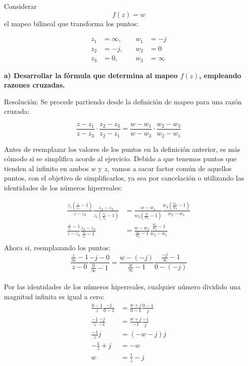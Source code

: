 \documentclass[12pt]{report}
\begin{document}
Considerar $$ f(z) = w $$ el mapeo bilineal que transforma los puntos:

\begin{align*}
    z_1 &= \infty, \quad & w_1 &= -j \\
    z_2 &= -j, \quad & w_2 &= 0 \\
    z_3 &= 0, \quad & w_3 &= \infty 
\end{align*}

\textbf{a) Desarrollar la fórmula que determina al mapeo \( f(z) \), empleando razones cruzadas.}

Resolución: Se procede partiendo desde la definición de mapeo para una razón cruzada:

$$ \frac{z - z_1}{z - z_3} \cdot \frac{z_2 - z_3}{z_2 - z_1} = \frac{w - w_1}{w - w_3} \cdot \frac{w_2 - w_3}{w_2 - w_1} $$

Antes de reemplazar los valores de los puntos en la definición anterior, es más cómodo si se simplifica acorde al ejercicio. Debido a que tenemos puntos que tienden al infinito en ambos \( w \) y \( z \), vamos a sacar factor común de aquellos puntos, con el objetivo de simplificarlos, ya sea por cancelación o utilizando las identidades de los números hiperreales:

\begin{align*}
    \frac{z_1 \left(\frac{z}{z_1}-1\right) }{z-z_3} \frac{z_2-z_3}{z_1 \left( \frac{z_3}{z_2} -1 \right) } &= \frac{w-w_1}{w_3 \left( \frac{w}{w_3} - 1 \right)} \frac{w_3 \left( \frac{w_1}{w_3} -1 \right) }{w_2-w_1}\\[10pt]
    \frac{\frac{z}{z_1} -1}{z-z_3} \frac{z_2-z_3}{\frac{z_3}{z_1}-1} &= \frac{w-w_1}{\frac{w}{w_3}-1} \frac{\frac{w_1}{w_3}-1}{w_2-w_1}\\
\end{align*}
Ahora si, reemplazando los puntos:\\

$$\frac{\frac{z}{\infty}-1}{z-0} \frac{-j-0}{\frac{0}{\infty}-1} = \frac{w-(-j)}{\frac{w}{\infty}-1} \frac{\frac{-j}{\infty}-1}{0-(-j)}$$\\

Por las identidades de los números hiperreales, cualquier número dividido una magnitud infinita es igual a cero:\\

\begin{align*}
    \frac{0-1}{z} \frac{-j}{0-1} &= \frac{w+j}{0-1} \frac{0-1}{j}\\
    \frac{-1}{z} \frac{-j}{-1} &= \frac{w+j}{-1} \frac{-1}{j}\\
    \frac{-1}{z}j &= (-w-j)j\\
    -\frac{1}{z}+j &= -w\\
    w &= \frac{1}{z}-j\\
\end{align*}
\end{document}
